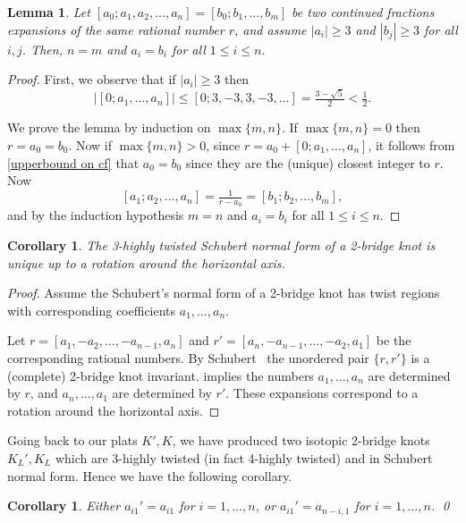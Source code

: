 \documentclass[12pt,reqno]{amsart}
\theoremstyle{plain}
\newtheorem{lemma}[theorem]{Lemma}
\newtheorem{corollary}[theorem]{Corollary}
\theoremstyle{definition}
\begin{document}
\begin{lemma}\label{uniqueness of continued fractions}
Let $[a_0;a_1,a_2,\dots,a_n] = [b_0;b_1,\dots,b_m]$ be two continued 
fractions expansions of the same rational number $r$, and assume $|a_i|\ge 3$ 
and $|b_j|\ge 3$ for all $i,j$. Then, $n=m$ and $a_i = b_i$ for all $1\le i\le n$.
\end{lemma}

\begin{proof}
First, we observe that if $|a_i|\ge 3$ then 
\begin{equation}\label{upperbound on cf}
|[0;a_1,\dots,a_n]| \le [0;3,-3,3,-3,\dots] = \tfrac{3 - \sqrt{5}}2<\tfrac12.
\end{equation}
    
We prove the lemma by induction on $\max\{m,n\}$. If $\max\{m,n\}=0$ then $r=a_0=b_0$. 
Now if $\max\{m,n\}>0$, since $r=a_0 + [0;a_1,\dots,a_n]$, it follows from 
\eqref{upperbound on cf} that $a_0=b_0$ since they are the (unique) closest integer 
to $r$. Now $$[a_1;a_2,\dots,a_n] =\tfrac{1}{r-a_0} = [b_1;b_2,\dots,b_m],$$ and 
by the induction hypothesis $m=n$ and $a_i=b_i$ for all $1\le i \le n$.
\end{proof}

\begin{corollary}\label{cor: unique}
The 3-highly twisted Schubert normal form of a 2-bridge knot is unique up 
to a rotation around the horizontal axis.
\end{corollary}

\begin{proof}
Assume the Schubert's normal form of a 2-bridge knot has twist regions  
with corresponding coefficients  $a_1,\dots,a_n$.  

Let  $r=[a_1, -a_2,\dots,-a_{n-1}, a_n]$ 
and $r'=[a_n, -a_{n-1},\dots,-a_2,a_1]$ be the corresponding rational numbers. 
By Schubert~\cite{Schu} the unordered pair $\{r,r'\}$ is a (complete) 2-bridge knot
invariant. 
 implies
the numbers $a_1,\dots,a_n$ are determined by $r$, and $a_n,\dots,a_1$ are 
determined by $r'$. These expansions correspond to a rotation around the 
horizontal axis.
\end{proof}

Going back to our plats $K',K$, we have produced two isotopic 2-bridge knots 
$K_L',K_L$ which are 3-highly twisted (in fact 4-highly twisted) and in Schubert 
normal form. Hence we have the following corollary.

\begin{corollary}\label{Cor:Coeffs2Bridge}
Either $a_{i1}' = a_{i1}$ for $i=1, \dots, n$, or $a_{i1}' = a_{n-i, 1}$ for
$i=1, \dots, n$.  \qed
\end{corollary}
\end{document}
